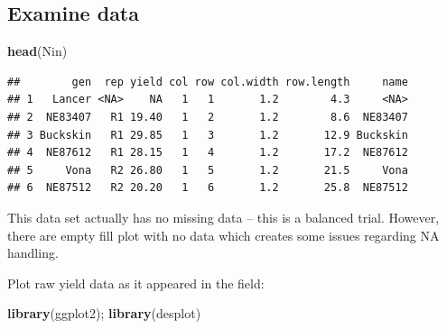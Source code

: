 \documentclass[
]{book}
\newenvironment{Shaded}{\begin{snugshade}}{\end{snugshade}}
\newcommand{\FunctionTok}[1]{\textcolor[rgb]{0.13,0.29,0.53}{\textbf{#1}}}
\newcommand{\NormalTok}[1]{#1}
\begin{document}
\hypertarget{examine-data}{%
\subsection{Examine data}\label{examine-data}}

\begin{Shaded}
\begin{Highlighting}[]
\FunctionTok{head}\NormalTok{(Nin)}
\end{Highlighting}
\end{Shaded}

\begin{verbatim}
##        gen  rep yield col row col.width row.length     name
## 1   Lancer <NA>    NA   1   1       1.2        4.3     <NA>
## 2  NE83407   R1 19.40   1   2       1.2        8.6  NE83407
## 3 Buckskin   R1 29.85   1   3       1.2       12.9 Buckskin
## 4  NE87612   R1 28.15   1   4       1.2       17.2  NE87612
## 5     Vona   R2 26.80   1   5       1.2       21.5     Vona
## 6  NE87512   R2 20.20   1   6       1.2       25.8  NE87512
\end{verbatim}

This data set actually has no missing data -- this is a balanced trial. However, there are empty fill plot with no data which creates some issues regarding NA handling.

Plot raw yield data as it appeared in the field:

\begin{Shaded}
\begin{Highlighting}[]
\FunctionTok{library}\NormalTok{(ggplot2); }\FunctionTok{library}\NormalTok{(desplot)}
\end{Highlighting}
\end{Shaded}
\end{document}
